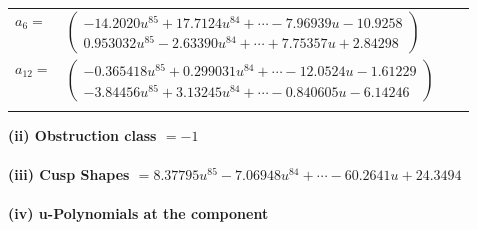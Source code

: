 \documentclass[1p]{elsarticle_modified}
\theoremstyle{definition}
\begin{document}
\begin{tabular}{m{7pt} m{180pt} m{7pt} m{180pt} }
\flushright $a_{6}=$&$\begin{pmatrix}-14.2020 u^{85}+17.7124 u^{84}+\cdots-7.96939 u-10.9258\\0.953032 u^{85}-2.63390 u^{84}+\cdots+7.75357 u+2.84298\end{pmatrix}$ \\
\flushright $a_{12}=$&$\begin{pmatrix}-0.365418 u^{85}+0.299031 u^{84}+\cdots-12.0524 u-1.61229\\-3.84456 u^{85}+3.13245 u^{84}+\cdots-0.840605 u-6.14246\end{pmatrix}$\\&\end{tabular}
\flushleft \textbf{(ii) Obstruction class $= -1$}\\~\\
\flushleft \textbf{(iii) Cusp Shapes $= 8.37795 u^{85}-7.06948 u^{84}+\cdots-60.2641 u+24.3494$}\\~\\
\newpage\renewcommand{\arraystretch}{1}
\flushleft \textbf{(iv) u-Polynomials at the component}\newline \\
\end{document}
